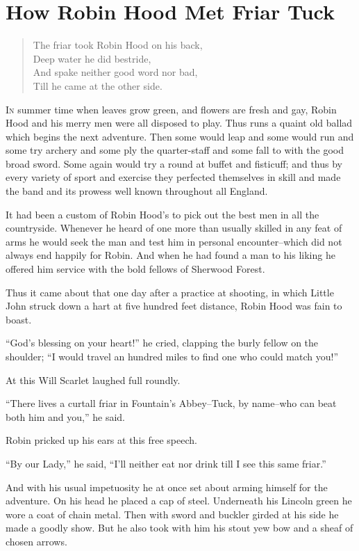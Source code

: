 \chapter{How Robin Hood Met Friar Tuck}

\begin{quote}
The friar took Robin Hood on his back,\\
Deep water he did bestride,\\
And spake neither good word nor bad,\\
Till he came at the other side.
\end{quote}

\lettrine{I}{n} summer time when leaves grow green, and flowers are fresh
and gay, Robin Hood and his merry men were all disposed to play. Thus
runs a quaint old ballad which begins the next adventure. Then some would
leap and some would run and some try archery and some ply the
quarter-staff and some fall to with the good broad sword. Some again
would try a round at buffet and fisticuff; and thus by every variety of
sport and exercise they perfected themselves in skill and made the band
and its prowess well known throughout all England.

It had been a custom of Robin Hood's to pick out the best men in all the
countryside. Whenever he heard of one more than usually skilled in any
feat of arms he would seek the man and test him in personal
encounter--which did not always end happily for Robin. And when he had
found a man to his liking he offered him service with the bold fellows
of Sherwood Forest.

Thus it came about that one day after a practice at shooting, in which
Little John struck down a hart at five hundred feet distance, Robin Hood
was fain to boast.

``God's blessing on your heart!'' he cried, clapping the burly fellow on
the shoulder; ``I would travel an hundred miles to find one who could
match you!''

At this Will Scarlet laughed full roundly.

``There lives a curtall friar in Fountain's Abbey--Tuck, by name--who
can beat both him and you,'' he said.

Robin pricked up his ears at this free speech.

``By our Lady,'' he said, ``I'll neither eat nor drink till I see this
same friar.''

And with his usual impetuosity he at once set about arming himself for
the adventure. On his head he placed a cap of steel. Underneath his
Lincoln green he wore a coat of chain metal. Then with sword and buckler
girded at his side he made a goodly show. But he also took with him his
stout yew bow and a sheaf of chosen arrows.

